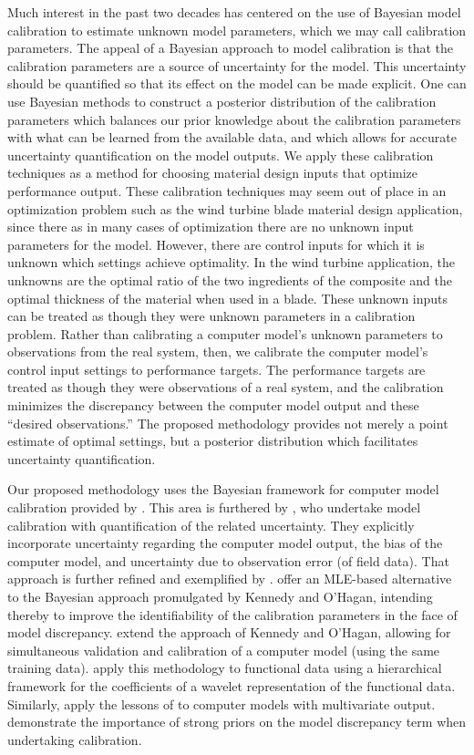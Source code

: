 \documentclass[12pt]{article}
\begin{document}
Much interest in the past two decades has centered on the use of Bayesian model calibration to estimate unknown model parameters, which we may call calibration parameters. 
%
The appeal of a Bayesian approach to model calibration is that the calibration parameters are a source of uncertainty for the model. 
%
This uncertainty should be quantified so that its effect on the model can be made explicit. 
%
One can use Bayesian methods to construct a posterior distribution of the calibration parameters which balances our prior knowledge about the calibration parameters with what can be learned from the available data, and which allows for accurate uncertainty quantification on the model outputs. 
%
We apply these calibration techniques as a method for choosing material design inputs that optimize performance output.
%
These calibration techniques may seem out of place in an optimization problem such as the wind turbine blade material design application, since there as in many cases of optimization there are no unknown input parameters for the model. 
%
However, there are control inputs for which it is unknown which settings achieve optimality.
%
In the wind turbine application, the unknowns are the optimal ratio of the two ingredients of the composite and the optimal thickness of the material when used in a blade.
%
These unknown inputs can be treated as though they were unknown parameters in a calibration problem.
%
Rather than calibrating a computer model's unknown parameters to observations from the real system, then, we calibrate the computer model's control input settings to performance targets.
%
The performance targets are treated as though they were observations of a real system, and the calibration minimizes the discrepancy between the computer model output and these ``desired observations.''
%
The proposed methodology provides not merely a point estimate of optimal settings, but a posterior distribution which facilitates uncertainty quantification.

Our proposed methodology uses the Bayesian framework for computer model calibration provided by  \cite{Kennedy2001}.
% 
This area is furthered by \cite{Higdon2004}, who undertake model calibration with quantification of the related uncertainty. 
They explicitly incorporate uncertainty regarding the computer model output, the bias of the computer model, and uncertainty due to observation error (of field data). 
%
That approach is further refined and exemplified by \cite{Williams2006}.
%
\cite{Loeppky2006} offer an MLE-based alternative to the Bayesian approach promulgated by Kennedy and O'Hagan, intending thereby to improve the identifiability of the calibration parameters in the face of model discrepancy. 
%
\cite{Bayarri2007} extend the approach of Kennedy and O'Hagan, allowing for simultaneous validation and calibration of a computer model (using the same training data). 
%
\cite{Bayarri} apply this methodology to functional data using a hierarchical framework for the coefficients of a wavelet representation of the functional data. 
%
Similarly, \cite{Paulo2012} apply the lessons of \cite{Bayarri2007} to computer models with multivariate output.
%
\cite{Brynjarsdottir2014} demonstrate the importance of strong priors on the model discrepancy term when undertaking calibration.
\end{document}
